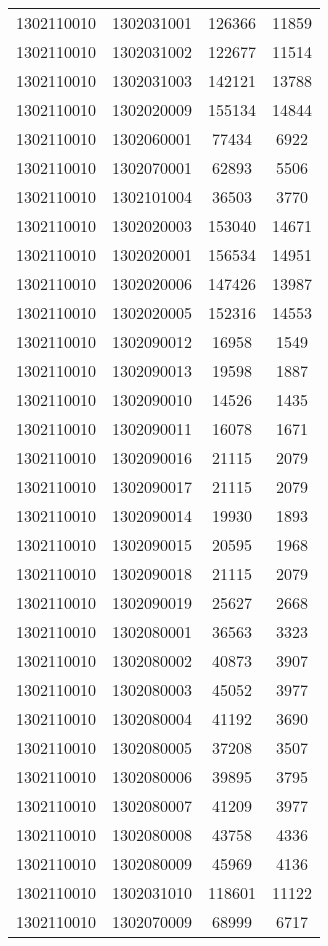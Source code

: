 \begin{longtable}[h]{llcc}
		1302110010 & 1302031001 & 126366 & 11859\\
		1302110010 & 1302031002 & 122677 & 11514\\
		1302110010 & 1302031003 & 142121 & 13788\\
		1302110010 & 1302020009 & 155134 & 14844\\
		1302110010 & 1302060001 & 77434 & 6922\\
		1302110010 & 1302070001 & 62893 & 5506\\
		1302110010 & 1302101004 & 36503 & 3770\\
		1302110010 & 1302020003 & 153040 & 14671\\
		1302110010 & 1302020001 & 156534 & 14951\\
		1302110010 & 1302020006 & 147426 & 13987\\
		1302110010 & 1302020005 & 152316 & 14553\\
		1302110010 & 1302090012 & 16958 & 1549\\
		1302110010 & 1302090013 & 19598 & 1887\\
		1302110010 & 1302090010 & 14526 & 1435\\
		1302110010 & 1302090011 & 16078 & 1671\\
		1302110010 & 1302090016 & 21115 & 2079\\
		1302110010 & 1302090017 & 21115 & 2079\\
		1302110010 & 1302090014 & 19930 & 1893\\
		1302110010 & 1302090015 & 20595 & 1968\\
		1302110010 & 1302090018 & 21115 & 2079\\
		1302110010 & 1302090019 & 25627 & 2668\\
		1302110010 & 1302080001 & 36563 & 3323\\
		1302110010 & 1302080002 & 40873 & 3907\\
		1302110010 & 1302080003 & 45052 & 3977\\
		1302110010 & 1302080004 & 41192 & 3690\\
		1302110010 & 1302080005 & 37208 & 3507\\
		1302110010 & 1302080006 & 39895 & 3795\\
		1302110010 & 1302080007 & 41209 & 3977\\
		1302110010 & 1302080008 & 43758 & 4336\\
		1302110010 & 1302080009 & 45969 & 4136\\
		1302110010 & 1302031010 & 118601 & 11122\\
		1302110010 & 1302070009 & 68999 & 6717\\

\end{longtable}
